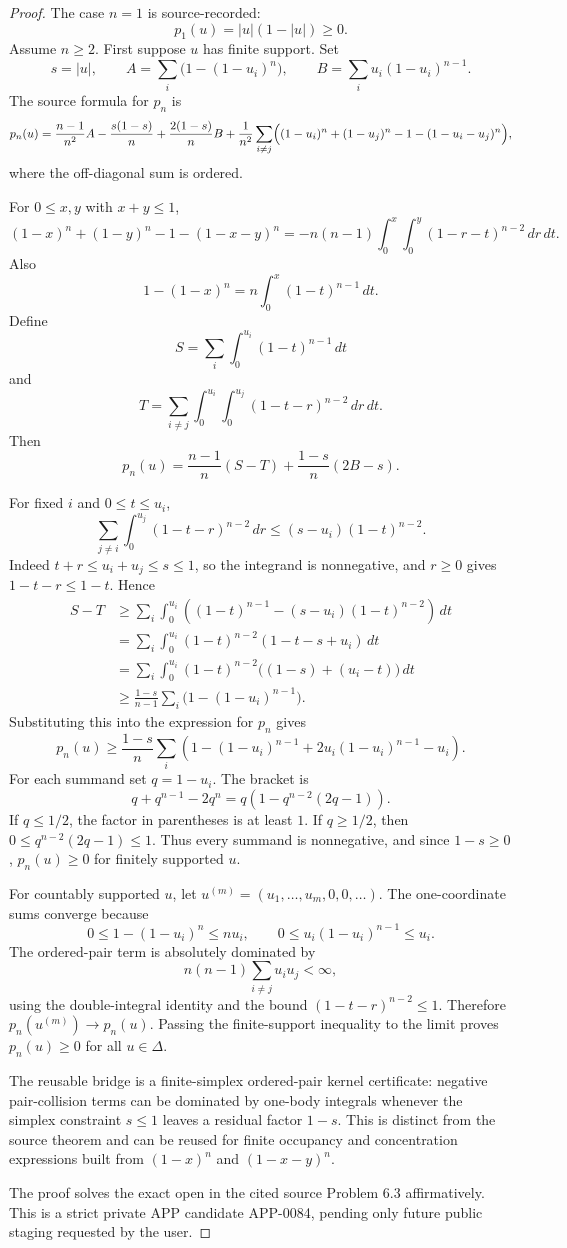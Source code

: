 \documentclass[11pt]{article}
\numberwithin{equation}{section}
\theoremstyle{definition}
\theoremstyle{remark}
\newcommand{\1}{\mathbf 1}
\begin{document}
\begin{proof}
The case \(n=1\) is source-recorded:
\[
p_1(u)=|u|(1-|u|)\ge0.
\]
Assume \(n\ge2\). First suppose \(u\) has finite support. Set
\[
s=|u|,\qquad
A=\sum_i\bigl(1-(1-u_i)^n\bigr),\qquad
B=\sum_i u_i(1-u_i)^{n-1}.
\]
The source formula for \(p_n\) is
\[
p_n(u)=\frac{n-1}{n^2}A-\frac{s(1-s)}n+\frac{2(1-s)}nB
+\frac1{n^2}\sum_{i\ne j}\Bigl((1-u_i)^n+(1-u_j)^n-1-(1-u_i-u_j)^n\Bigr),
\]
where the off-diagonal sum is ordered.

For \(0\le x,y\) with \(x+y\le1\),
\[
(1-x)^n+(1-y)^n-1-(1-x-y)^n
=-n(n-1)\int_0^x\int_0^y(1-r-t)^{n-2}\,dr\,dt.
\]
Also
\[
1-(1-x)^n=n\int_0^x(1-t)^{n-1}\,dt.
\]
Define
\[
S=\sum_i\int_0^{u_i}(1-t)^{n-1}\,dt
\]
and
\[
T=\sum_{i\ne j}\int_0^{u_i}\int_0^{u_j}(1-t-r)^{n-2}\,dr\,dt .
\]
Then
\[
p_n(u)=\frac{n-1}{n}(S-T)+\frac{1-s}{n}(2B-s).
\]

For fixed \(i\) and \(0\le t\le u_i\),
\[
\sum_{j\ne i}\int_0^{u_j}(1-t-r)^{n-2}\,dr
\le (s-u_i)(1-t)^{n-2}.
\]
Indeed \(t+r\le u_i+u_j\le s\le1\), so the integrand is nonnegative, and \(r\ge0\) gives \(1-t-r\le1-t\). Hence
\[
\begin{aligned}
S-T
&\ge \sum_i\int_0^{u_i}
\left((1-t)^{n-1}-(s-u_i)(1-t)^{n-2}\right)\,dt\\
&=\sum_i\int_0^{u_i}(1-t)^{n-2}(1-t-s+u_i)\,dt\\
&=\sum_i\int_0^{u_i}(1-t)^{n-2}\bigl((1-s)+(u_i-t)\bigr)\,dt\\
&\ge \frac{1-s}{n-1}\sum_i\bigl(1-(1-u_i)^{n-1}\bigr).
\end{aligned}
\]
Substituting this into the expression for \(p_n\) gives
\[
p_n(u)\ge
\frac{1-s}{n}\sum_i
\left(1-(1-u_i)^{n-1}+2u_i(1-u_i)^{n-1}-u_i\right).
\]
For each summand set \(q=1-u_i\). The bracket is
\[
q+q^{n-1}-2q^n
=q\left(1-q^{n-2}(2q-1)\right).
\]
If \(q\le1/2\), the factor in parentheses is at least \(1\). If \(q\ge1/2\), then \(0\le q^{n-2}(2q-1)\le1\). Thus every summand is nonnegative, and since \(1-s\ge0\), \(p_n(u)\ge0\) for finitely supported \(u\).

For countably supported \(u\), let \(u^{(m)}=(u_1,\ldots,u_m,0,0,\ldots)\). The one-coordinate sums converge because
\[
0\le 1-(1-u_i)^n\le n u_i,\qquad 0\le u_i(1-u_i)^{n-1}\le u_i.
\]
The ordered-pair term is absolutely dominated by
\[
n(n-1)\sum_{i\ne j}u_i u_j<\infty,
\]
using the double-integral identity and the bound \((1-t-r)^{n-2}\le1\). Therefore \(p_n(u^{(m)})\to p_n(u)\). Passing the finite-support inequality to the limit proves \(p_n(u)\ge0\) for all \(u\in\Delta\).

The reusable bridge is a finite-simplex ordered-pair kernel certificate: negative pair-collision terms can be dominated by one-body integrals whenever the simplex constraint \(s\le1\) leaves a residual factor \(1-s\). This is distinct from the source theorem and can be reused for finite occupancy and concentration expressions built from \((1-x)^n\) and \((1-x-y)^n\).

The proof solves the exact open in the cited source Problem 6.3 affirmatively. This is a strict private APP candidate APP-0084, pending only future public staging requested by the user.
\end{proof}
\end{document}

